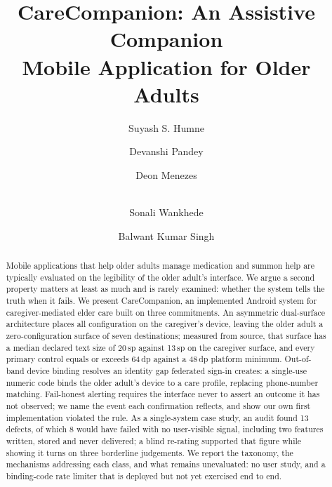 \documentclass[runningheads,a4paper]{llncs}
\begin{document}
\title{CareCompanion: An Assistive Companion\\Mobile Application for Older Adults}

\author{Suyash S. Humne \and Devanshi Pandey \and
Deon Menezes \and\\ Sonali Wankhede \and Balwant Kumar Singh}


\maketitle

\begin{abstract}
Mobile applications that help older adults manage medication and summon help are typically
evaluated on the legibility of the older adult's interface. We argue a second property
matters at least as much and is rarely examined: whether the system tells the truth when it
fails. We present CareCompanion, an implemented Android system for caregiver-mediated elder
care built on three commitments. An asymmetric dual-surface architecture places all
configuration on the caregiver's device, leaving the older adult a zero-configuration
surface of seven destinations; measured from source, that surface has a median declared
text size of 20\,sp against 13\,sp on the caregiver surface, and every primary control
equals or exceeds 64\,dp against a 48\,dp platform minimum. Out-of-band device binding
resolves an identity gap federated sign-in creates: a single-use numeric code binds the
older adult's device to a care profile, replacing phone-number matching. Fail-honest
alerting requires the interface never to assert an outcome it has not observed; we name
the event each confirmation reflects, and show our own first implementation violated the
rule. As a single-system case study, an audit found 13 defects, of which 8
would have failed with no user-visible signal, including two features written, stored and
never delivered; a blind re-rating supported that figure while
showing it turns on three borderline judgements. We report the taxonomy, the mechanisms
addressing each class, and what remains unevaluated: no user study, and a binding-code rate
limiter that is deployed but not yet exercised end to end.

\end{abstract}
\end{document}
